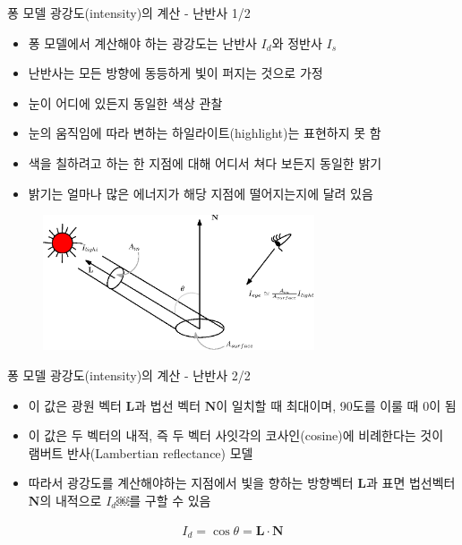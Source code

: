 \documentclass{beamer}
\begin{document}
\begin{frame}[fragile]{퐁 모델 광강도(intensity)의 계산 - 난반사 1/2}

\begin{itemize}
\item 퐁 모델에서 계산해야 하는 광강도는 난반사 $I_d$와 정반사 $I_s$
\item 난반사는 모든 방향에 동등하게 빛이 퍼지는 것으로 가정
\item 눈이 어디에 있든지 동일한 색상 관찰
\item 눈의 움직임에 따라 변하는 하일라이트(highlight)는 표현하지 못 함
\item 색을 칠하려고 하는 한 지점에 대해 어디서 쳐다 보든지 동일한 밝기
\item 밝기는 얼마나 많은 에너지가 해당 지점에 떨어지는지에 달려 있음
\end{itemize}

\begin{figure}[h!]
  \centering
    \includegraphics[height=4cm]{OGL_light/diffuseConcept.eps}
\end{figure}


\end{frame}

\begin{frame}[fragile]{퐁 모델 광강도(intensity)의 계산 - 난반사 2/2}

\begin{itemize}
\item 이 값은 광원 벡터 $\mathbf L$과 법선 벡터 $\mathbf N$이 일치할 때 최대이며, 90도를 이룰 때 0이 됨
\item 이 값은 두 벡터의 내적, 즉 두 벡터 사잇각의 코사인(cosine)에 비례한다는 것이 램버트 반사(Lambertian reflectance) 모델
\item 따라서 광강도를 계산해야하는 지점에서 빛을 향하는 방향벡터 $\mathbf L$과 표면 법선벡터 $\mathbf N$의 내적으로  $I_d$￼를 구할 수 있음
\end{itemize}

\begin{eqnarray}
\label{eq:diffuseIntensity}
I_d  =  \cos \theta   = \mathbf L \cdot \mathbf N
\end{eqnarray}

\end{frame}
\end{document}

